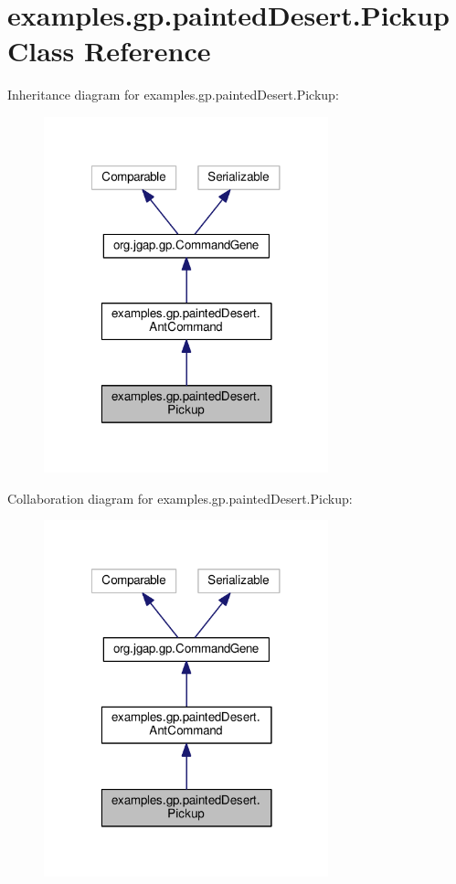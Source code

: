 \hypertarget{classexamples_1_1gp_1_1painted_desert_1_1_pickup}{\section{examples.\-gp.\-painted\-Desert.\-Pickup Class Reference}
\label{classexamples_1_1gp_1_1painted_desert_1_1_pickup}
}


Inheritance diagram for examples.\-gp.\-painted\-Desert.\-Pickup\-:
\nopagebreak
\begin{figure}[H]
\begin{center}
\leavevmode
\includegraphics[width=233pt]{classexamples_1_1gp_1_1painted_desert_1_1_pickup__inherit__graph}
\end{center}
\end{figure}


Collaboration diagram for examples.\-gp.\-painted\-Desert.\-Pickup\-:
\nopagebreak
\begin{figure}[H]
\begin{center}
\leavevmode
\includegraphics[width=233pt]{classexamples_1_1gp_1_1painted_desert_1_1_pickup__coll__graph}
\end{center}
\end{figure}
